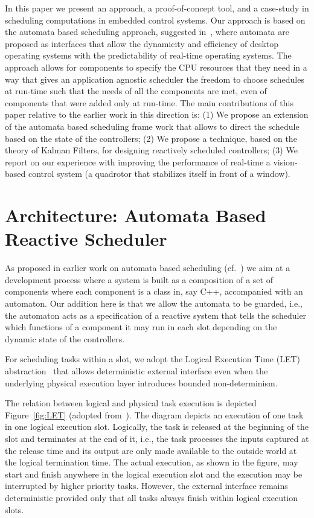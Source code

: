 \documentclass{sig-alternate-ipsn13}
\begin{document}
In this paper we present an approach, a proof-of-concept tool, and a case-study in scheduling computations in embedded control systems. Our approach is based on the automata based scheduling approach, suggested in~\cite{WA07,RTComposer,AW08}, where automata are proposed as interfaces that allow the dynamicity and efficiency of desktop operating systems with the predictability of real-time operating systems. The approach allows for components to specify the CPU resources that they need in a way that gives an application agnostic scheduler the freedom to choose schedules at run-time such that the needs of all the components are met, even of components that were added only at run-time.  The main contributions of this paper relative to the earlier work in this direction is:
(1) We propose an extension of the automata based scheduling frame work that allows to direct the schedule based on the state of the controllers; (2) We propose a technique, based on the theory of Kalman Filters, for designing reactively scheduled controllers; (3) We report on our experience with improving the performance of real-time a vision-based control system (a quadrotor that stabilizes itself in front of a window).

\section{Architecture: Automata Based Reactive Scheduler}

As proposed in earlier work on automata based scheduling (cf.~\cite{WA07,RTComposer,AW08}) we aim at a development process where a system is built as a composition of a set of components where each component is a class in, say C++, accompanied with an automaton. Our addition here is that we allow the automata to be guarded, i.e., the automaton acts as a specification of a reactive system that tells the scheduler which functions of a component it may run in each slot depending on the dynamic state of the controllers.

For scheduling tasks within a slot, we adopt the Logical Execution Time (LET)
abstraction~\cite{DBLP:journals/pieee/HenzingerHK03} that allows deterministic
external interface even when the underlying physical execution layer introduces
bounded non-determinism.

The relation between logical and physical task execution is depicted Figure~\ref{fig:LET} (adopted
from~\cite{DBLP:conf/lctrts/FarcasFPT05}). The diagram depicts an execution of one task in one
logical execution slot.  Logically, the task is released at the beginning of the slot and terminates
at the end of it, i.e., the task processes the inputs captured at the release time and its output
are only made available to the outside world at the logical termination time. The actual execution,
as shown in the figure, may start and finish anywhere in the logical execution slot and the
execution may be interrupted by higher priority tasks. However, the external interface remains
deterministic provided only that all tasks always finish within logical execution slots.
\end{document}
